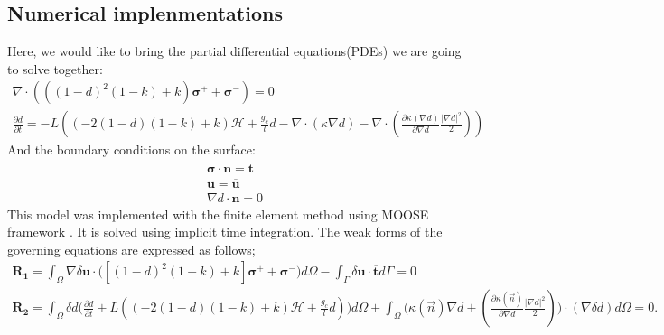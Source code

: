 \documentclass[3p,10pt,sort&compress]{elsarticle}
\begin{document}
\subsection{Numerical implenmentations}
Here, we would like to bring the partial differential equations(PDEs) we are going to solve together:
\begin{eqnarray}
  \nabla \cdot \left( \left((1-d)^2(1-k) + k\right)\boldsymbol{\sigma}^+ + \boldsymbol{\sigma}^- \right) = 0 \\
  \frac{\partial d}{\partial t} = -L \left( (-2(1-d)(1-k) + k) \mathcal{H} + \frac{g_c}{l}d - \nabla \cdot (\kappa \nabla d) - \nabla \cdot \left(\frac{\partial \kappa(\nabla d)}{\partial \nabla d} \frac{|\nabla d|^2}{2} \right) \right)
\end{eqnarray}
And the boundary conditions on the surface:
\begin{eqnarray}
  \boldsymbol{\sigma} \cdot \boldsymbol{n} = \boldsymbol{\overline{t}} \\
  \boldsymbol{u} = \boldsymbol{\overline{u}} \\
  \nabla d \cdot \boldsymbol{n} = 0
\end{eqnarray}
This model was implemented with the finite element method using MOOSE framework \cite{tonks2012object}. It is solved using implicit time integration. The weak forms of the governing equations are expressed as follows;
\begin{eqnarray}
  \boldsymbol{R_1} = \int_\Omega \nabla \delta \boldsymbol{u} \cdot \Big( [(1-d)^2(1-k) + k]\boldsymbol{\sigma^+} + \boldsymbol{\sigma^-} \Big) d \Omega - \int_\Gamma \delta \boldsymbol{u} \cdot \boldsymbol{\overline{t}} d \Gamma = 0 \\
  \boldsymbol{R_2} = \int_\Omega \delta d \Bigg(  \frac{\partial d}{\partial t} + L \left( (-2(1-d)(1-k) + k) \mathcal{H} + \frac{g_c}{l}d \right) \Bigg)d\Omega  + \int_\Omega \Bigg( \kappa(\vec{n}) \nabla d + \left(\frac{\partial \kappa(\vec{n})}{\partial \nabla d} \frac{|\nabla d|^2}{2} \right)   \Bigg)\cdot(\nabla \delta d) d\Omega = 0.
\end{eqnarray}
\end{document}
